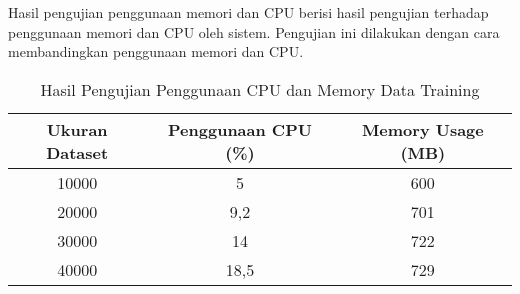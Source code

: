 Hasil pengujian penggunaan memori dan CPU berisi hasil pengujian terhadap penggunaan memori dan CPU oleh sistem. Pengujian ini dilakukan dengan cara membandingkan penggunaan memori dan CPU.

\begin{table}[H]
    \caption{Hasil Pengujian Penggunaan CPU dan Memory Data Training}
    \centering
    \begin{tabular}{|c|c|c|}
    \hline
    \textbf{Ukuran Dataset} & \textbf{Penggunaan CPU (\%)} & \textbf{Memory Usage (MB)} \\
    \hline
    10000 & 5 & 600 \\
    \hline
    20000 & 9,2 & 701 \\
    \hline
    30000 & 14 & 722 \\
    \hline
    40000 & 18,5 & 729 \\
    \hline
    \end{tabular}
    \label{table:1}
\end{table}